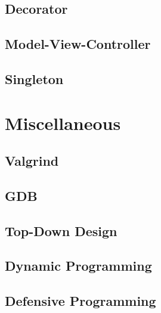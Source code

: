 \documentclass[letterpaper,10pt]{book}
\begin{document}
\chapter{Decorator}
\chapter{Model-View-Controller}
\chapter{Singleton}


\part{Miscellaneous}

\chapter{Valgrind}
\chapter{GDB}

\chapter{Top-Down Design}
\chapter{Dynamic Programming}
\chapter{Defensive Programming}
\end{document}
